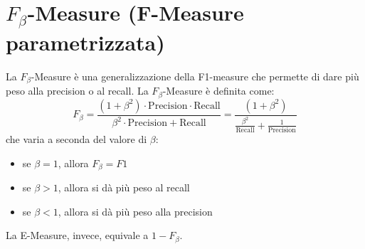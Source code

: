 \documentclass{report}
\begin{document}
	\section{$F_{\beta}$-Measure (F-Measure parametrizzata)}
	La $F_{\beta}$-Measure è una generalizzazione della F1-measure che permette di dare più peso alla precision o al recall. La $F_{\beta}$-Measure è definita come:
	\[
		F_{\beta} = \frac{(1 + \beta^2) \cdot \text{Precision} \cdot \text{Recall}}{\beta^2 \cdot \text{Precision} + \text{Recall}} = \frac{(1 + \beta^2)}{\frac{\beta^2}{\text{Recall}} + \frac{1}{\text{Precision}}}
	\]
	che varia a seconda del valore di $\beta$:
	\begin{itemize}
		\item se $\beta = 1$, allora $F_{\beta} = F1$
		\item se $\beta > 1$, allora si dà più peso al recall
		\item se $\beta < 1$, allora si dà più peso alla precision
	\end{itemize}
	La E-Measure, invece, equivale a $1 - F_{\beta}$.
\end{document}
